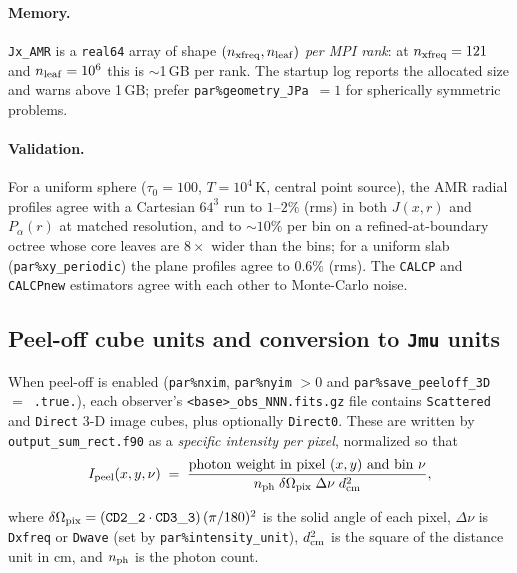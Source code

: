 \documentclass[english,a4paper]{my_memo}
\newcommand{\parm}[1]{\texttt{par\%#1}}
\begin{document}
\paragraph{Memory.}
\texttt{Jx\_AMR} is a \texttt{real64} array of shape
$(n_{\rm xfreq}, n_{\rm leaf})$ \emph{per MPI rank}: at
$n_{\rm xfreq} = 121$ and $n_{\rm leaf} = 10^6$ this is $\sim$1\,GB per
rank.  The startup log reports the allocated size and warns above 1\,GB;
prefer \parm{geometry\_JPa}~$=1$ for spherically symmetric problems.

\paragraph{Validation.}
For a uniform sphere ($\tau_0 = 100$, $T = 10^4$\,K, central point source),
the AMR radial profiles agree with a Cartesian $64^3$ run to $1$--$2\%$
(rms) in both $J(x, r)$ and $P_\alpha(r)$ at matched resolution, and to
$\sim$$10\%$ per bin on a refined-at-boundary octree whose core leaves are
$8\times$ wider than the bins; for a uniform slab (\parm{xy\_periodic}) the
plane profiles agree to $0.6\%$ (rms).  The \texttt{CALCP} and
\texttt{CALCPnew} estimators agree with each other to Monte-Carlo noise.

\subsection{Peel-off cube units and conversion to \texttt{Jmu} units}
\label{sec:peel_units}

When peel-off is enabled (\parm{nxim}, \parm{nyim} $>0$ and
\parm{save\_peeloff\_3D}~$=$~\texttt{.true.}), each observer's
\texttt{<base>\_obs\_NNN.fits.gz} file contains \texttt{Scattered} and
\texttt{Direct} 3-D image cubes, plus optionally \texttt{Direct0}.
These are written by \texttt{output\_sum\_rect.f90} as a
\emph{specific intensity per pixel}, normalized so that
\begin{equation}
  I_{\rm peel}(x,y,\nu)
  \;=\;
  \frac{\text{photon weight in pixel } (x,y) \text{ and bin } \nu}
       {n_{\rm ph}\;\delta\Omega_{\rm pix}\;\Delta\nu\;d_{\rm cm}^{2}},
  \label{eq:peel_unit}
\end{equation}
\begin{sloppypar}
where $\delta\Omega_{\rm pix} = (\mathtt{CD2\_2}\cdot\mathtt{CD3\_3})\,(\pi/180)^{2}$
is the solid angle of each pixel, $\Delta\nu$ is \texttt{Dxfreq} or
\texttt{Dwave} (set by \parm{intensity\_unit}), $d_{\rm cm}^{2}$ is the
square of the distance unit in cm, and $n_{\rm ph}$ is the photon count.
\end{sloppypar}
\end{document}
